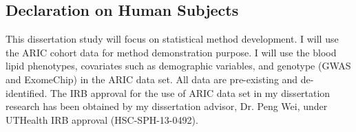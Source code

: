 \documentclass[12pt]{article}
\begin{document}




\subsection{Declaration on Human Subjects}
This dissertation study will focus on statistical method development. I will use the ARIC cohort data for method demonstration purpose. I will use the blood lipid phenotypes, covariates such as demographic variables, and genotype (GWAS and ExomeChip) in the ARIC data set. All data are pre-existing and de-identified. The IRB approval for the use of ARIC data set in my dissertation research has been obtained by my dissertation advisor, Dr. Peng Wei, under UTHealth IRB approval (HSC-SPH-13-0492).
\end{document}
